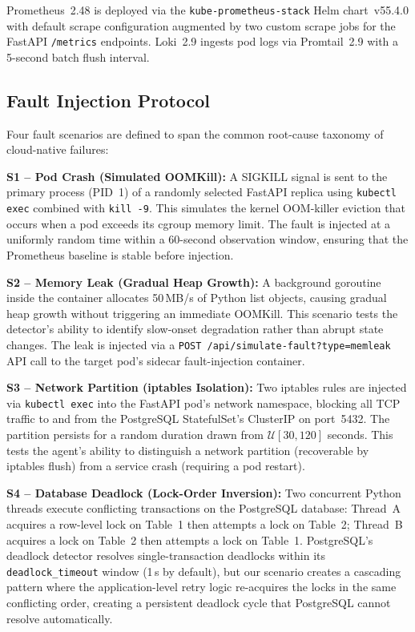 \documentclass[journal,10pt,twoside]{IEEEtran}
\begin{document}
Prometheus~2.48 is deployed via the \texttt{kube-prometheus-stack} Helm
chart~v55.4.0 with default scrape configuration augmented by two custom
scrape jobs for the FastAPI \texttt{/metrics} endpoints. Loki~2.9 ingests
pod logs via Promtail~2.9 with a 5-second batch flush interval.

\subsection{Fault Injection Protocol}

Four fault scenarios are defined to span the common root-cause taxonomy
of cloud-native failures:

\textbf{S1 -- Pod Crash (Simulated OOMKill):}
A SIGKILL signal is sent to the primary process (PID~1) of a randomly
selected FastAPI replica using \texttt{kubectl exec} combined with
\texttt{kill -9}. This simulates the kernel OOM-killer eviction that
occurs when a pod exceeds its cgroup memory limit. The fault is injected
at a uniformly random time within a 60-second observation window,
ensuring that the Prometheus baseline is stable before injection.

\textbf{S2 -- Memory Leak (Gradual Heap Growth):}
A background goroutine inside the container allocates 50\,MB/s of
Python list objects, causing gradual heap growth without triggering
an immediate OOMKill. This scenario tests the detector's ability to
identify slow-onset degradation rather than abrupt state changes.
The leak is injected via a \texttt{POST /api/simulate-fault?type=memleak}
API call to the target pod's sidecar fault-injection container.

\textbf{S3 -- Network Partition (iptables Isolation):}
Two iptables rules are injected via \texttt{kubectl exec} into the
FastAPI pod's network namespace, blocking all TCP traffic to and from
the PostgreSQL StatefulSet's ClusterIP on port~5432. The partition
persists for a random duration drawn from $\mathcal{U}[30, 120]$ seconds.
This tests the agent's ability to distinguish a network partition
(recoverable by iptables flush) from a service crash (requiring a pod
restart).

\textbf{S4 -- Database Deadlock (Lock-Order Inversion):}
Two concurrent Python threads execute conflicting transactions on the
PostgreSQL database: Thread~A acquires a row-level lock on Table~1 then
attempts a lock on Table~2; Thread~B acquires a lock on Table~2 then
attempts a lock on Table~1. PostgreSQL's deadlock detector resolves
single-transaction deadlocks within its \texttt{deadlock\_timeout} window
(1\,s by default), but our scenario creates a cascading pattern where
the application-level retry logic re-acquires the locks in the same
conflicting order, creating a persistent deadlock cycle that PostgreSQL
cannot resolve automatically.
\end{document}
